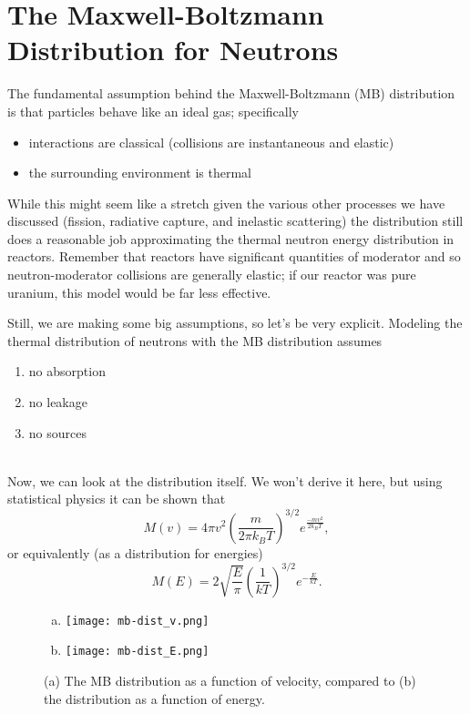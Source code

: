 \documentclass{report}
\begin{document}
\newpage
\section*{The Maxwell-Boltzmann Distribution for Neutrons} 

The fundamental assumption behind the Maxwell-Boltzmann (MB) distribution is that particles behave like an ideal gas; specifically
\begin{itemize}
\item interactions are classical (collisions are instantaneous and elastic)
\item the surrounding environment is thermal
\end{itemize}
While this might seem like a stretch given the various other processes we have discussed (fission, radiative capture, and inelastic scattering) the distribution still does a reasonable job approximating the thermal neutron energy distribution in reactors. Remember that reactors have significant quantities of moderator and so neutron-moderator collisions are generally elastic; if our reactor was pure uranium, this model would be far less effective.

Still, we are making some big assumptions, so let's be very explicit. Modeling the thermal distribution of neutrons with the MB distribution assumes
\begin{enumerate}
\item no absorption
\item no leakage
\item no sources
\end{enumerate}
\-\\
Now, we can look at the distribution itself. We won't derive it here, but using statistical physics it can be shown that
$$ M(v) = 4 \pi v^2 \left(\frac{m}{2 \pi k_B T} \right)^{3/2} e^{\frac{-m v^2}{2 k_B T}} ,$$
or equivalently (as a distribution for energies)
$$ M(E) = 2\sqrt{\frac{E}{\pi}}\left(\frac{1}{kT}\right)^{3/2} e^{-\frac{E}{kT}} .$$
\begin{figure}[h]
\begin{multicols}{2}\begin{enumerate}[(a)]
\item \texttt{[image: mb-dist\_v.png]}
\item \texttt{[image: mb-dist\_E.png]}
\end{enumerate}\end{multicols}
\caption{(a) The MB distribution as a function of velocity, compared to (b) the distribution as a function of energy.}
\end{figure}
\end{document}
